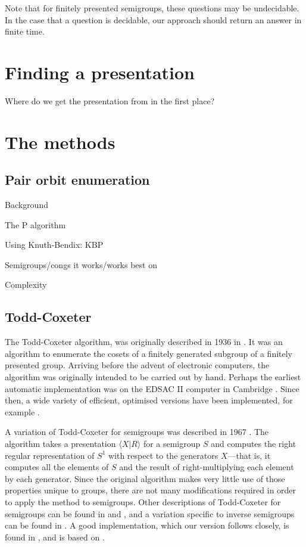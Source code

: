 Note that for finitely presented semigroups, these questions may be
undecidable.  In the case that a question is decidable, our approach should
return an answer in finite time.

\section{Finding a presentation}

Where do we get the presentation from in the first place?

\section{The methods}

\subsection{Pair orbit enumeration}
\label{sec:p}

Background

The P algorithm

Using Knuth-Bendix: KBP

Semigroups/congs it works/works best on

Complexity

\subsection{Todd-Coxeter}
\label{sec:tc}

The Todd-Coxeter algorithm, was originally described in 1936 in
\cite{todd_coxeter_1936}.  It was an algorithm to enumerate the cosets of a
finitely generated subgroup of a finitely presented group.  Arriving before the
advent of electronic computers, the algorithm was originally intended to be
carried out by hand.  Perhaps the earliest automatic implementation was on the
EDSAC II computer in Cambridge \cite{leech_1963}.  Since then, a wide variety of
efficient, optimised versions have been implemented, for example \cite{ace}.

A variation of Todd-Coxeter for semigroups was described in 1967
\cite{neumann_1967}.  The algorithm takes a presentation $\langle X | R \rangle$
for a semigroup $S$ and computes the right regular representation of $S^1$ with
respect to the generators $X$---that is, it computes all the elements of $S$ and
the result of right-multiplying each element by each generator.  Since the
original algorithm makes very little use of those properties unique to groups,
there are not many modifications required in order to apply the method to
semigroups.  Other descriptions of Todd-Coxeter for semigroups can be found in
\cite[ch.~12]{ruskuc_thesis} and \cite[ch.~1.2]{walker_thesis}, and a variation
specific to inverse semigroups can be found in \cite{cutting_thesis}.  A good
implementation, which our version follows closely, is found in
\cite[\texttt{lib/tcsemi.gi}]{gap}, and is based on \cite{walker_thesis}.

